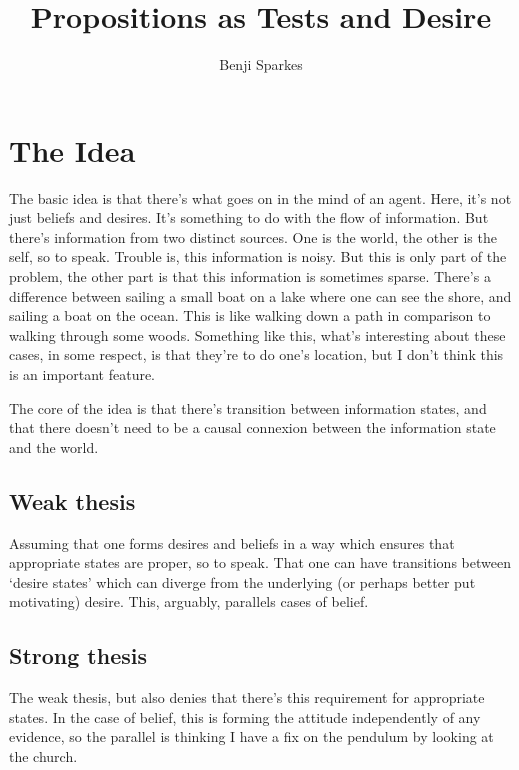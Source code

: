 \documentclass[10pt]{article}
\title{Propositions as Tests and Desire}
\author{Benji Sparkes}
\begin{document}
\maketitle

\section{The Idea}
\label{sec:idea}

The basic idea is that there's what goes on in the mind of an agent.
Here, it's not just beliefs and desires.
It's something to do with the flow of information.
But there's information from two distinct sources.
One is the world, the other is the self, so to speak.
Trouble is, this information is noisy.
But this is only part of the problem, the other part is that this information is sometimes sparse.
There's a difference between sailing a small boat on a lake where one can see the shore, and sailing a boat on the ocean.
This is like walking down a path in comparison to walking through some woods.
Something like this, what's interesting about these cases, in some respect, is that they're to do one's location, but I don't think this is an important feature.


The core of the idea is that there's transition between information states, and that there doesn't need to be a causal connexion between the information state and the world.


\subsection{Weak thesis}
\label{sec:weak-thesis}

Assuming that one forms desires and beliefs in a way which ensures that appropriate states are proper, so to speak.
That one can have transitions between `desire states' which can diverge from the underlying (or perhaps better put motivating) desire.
This, arguably, parallels cases of belief.

\subsection{Strong thesis}
\label{sec:strong-thesis}


The weak thesis, but also denies that there's this requirement for appropriate states.
In the case of belief, this is forming the attitude independently of any evidence, so the parallel is thinking I have a fix on the pendulum by looking at the church.
\end{document}
